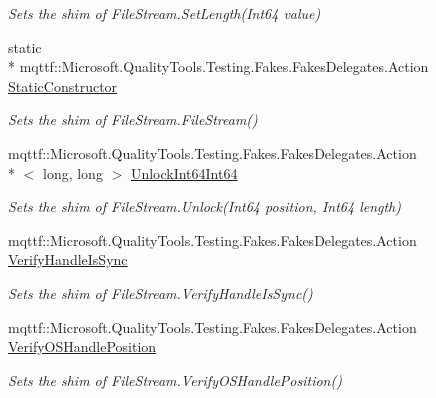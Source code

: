 \begin{DoxyCompactItemize}
\begin{DoxyCompactList}\small\item\em Sets the shim of File\-Stream.\-Set\-Length(\-Int64 value)\end{DoxyCompactList}\item 
static \\*
mqttf\-::\-Microsoft.\-Quality\-Tools.\-Testing.\-Fakes.\-Fakes\-Delegates.\-Action \hyperlink{class_system_1_1_i_o_1_1_fakes_1_1_shim_file_stream_a7b0672b5e8920b673f1913fc885a0c90}{Static\-Constructor}
\begin{DoxyCompactList}\small\item\em Sets the shim of File\-Stream.\-File\-Stream()\end{DoxyCompactList}\item 
mqttf\-::\-Microsoft.\-Quality\-Tools.\-Testing.\-Fakes.\-Fakes\-Delegates.\-Action\\*
$<$ long, long $>$ \hyperlink{class_system_1_1_i_o_1_1_fakes_1_1_shim_file_stream_aaaff55aa9232c7b1085f5a3cd0c22992}{Unlock\-Int64\-Int64}
\begin{DoxyCompactList}\small\item\em Sets the shim of File\-Stream.\-Unlock(\-Int64 position, Int64 length)\end{DoxyCompactList}\item 
mqttf\-::\-Microsoft.\-Quality\-Tools.\-Testing.\-Fakes.\-Fakes\-Delegates.\-Action \hyperlink{class_system_1_1_i_o_1_1_fakes_1_1_shim_file_stream_ac86c9514df54967abec11b3af01dd650}{Verify\-Handle\-Is\-Sync}
\begin{DoxyCompactList}\small\item\em Sets the shim of File\-Stream.\-Verify\-Handle\-Is\-Sync()\end{DoxyCompactList}\item 
mqttf\-::\-Microsoft.\-Quality\-Tools.\-Testing.\-Fakes.\-Fakes\-Delegates.\-Action \hyperlink{class_system_1_1_i_o_1_1_fakes_1_1_shim_file_stream_a07f680eb28fe0b5348bd623939e1ad59}{Verify\-O\-S\-Handle\-Position}
\begin{DoxyCompactList}\small\item\em Sets the shim of File\-Stream.\-Verify\-O\-S\-Handle\-Position()\end{DoxyCompactList}\item 

\end{DoxyCompactItemize}
